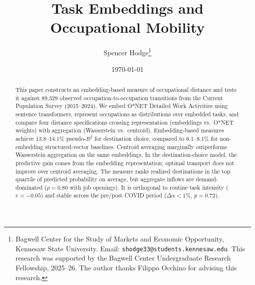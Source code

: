 \documentclass[12pt]{article}
\begin{document}
\title{Task Embeddings and Occupational Mobility}

\author{Spencer Hodge\thanks{Bagwell Center for the Study of Markets and Economic Opportunity, Kennesaw State University. Email: \texttt{shodge33@students.kennesaw.edu}. This research was supported by the Bagwell Center Undergraduate Research Fellowship, 2025--26. The author thanks Filippo Occhino for advising this research.}}

\date{\today}

\maketitle


\begin{abstract}
This paper constructs an embedding-based measure of occupational distance and tests it against 89,329 observed occupation-to-occupation transitions from the Current Population Survey (2015--2024). We embed O*NET Detailed Work Activities using sentence transformers, represent occupations as distributions over embedded tasks, and compare four distance specifications crossing representation (embeddings vs.\ O*NET weights) with aggregation (Wasserstein vs.\ centroid). Embedding-based measures achieve 13.8--14.1\% pseudo-$R^2$ for destination choice, compared to 6.1--8.1\% for non-embedding structured-vector baselines. Centroid averaging marginally outperforms Wasserstein aggregation on the same embeddings. In the destination-choice model, the predictive gain comes from the embedding representation; optimal transport does not improve over centroid averaging. The measure ranks realized destinations in the top quartile of predicted probability on average, but aggregate inflows are demand-dominated ($\rho = 0.80$ with job openings). It is orthogonal to routine task intensity ($r = -0.05$) and stable across the pre/post COVID period ($\Delta\alpha < 1\%$, $p = 0.72$).
\end{abstract}


\vspace{1em}
\noindent{}
\vspace{1em}
\end{document}
